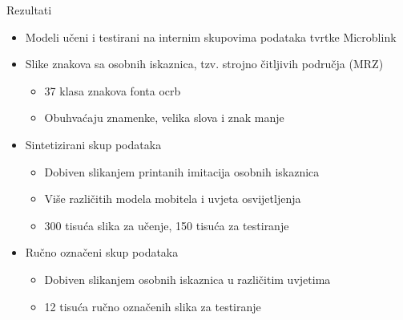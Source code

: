 \documentclass[pdf]{beamer}
\begin{document}
\begin{frame}{Rezultati}

\begin{itemize}
\setlength\itemsep{0.5em}

 \item Modeli učeni i testirani na internim skupovima podataka tvrtke Microblink
 
 \item Slike znakova sa osobnih iskaznica, tzv. strojno čitljivih područja (MRZ)
 \begin{itemize}
 	\item  37 klasa znakova fonta ocrb
 	\item Obuhvaćaju znamenke, velika slova i znak manje
 \end{itemize}
 
 \item Sintetizirani skup podataka
 \begin{itemize}
 	\item  Dobiven slikanjem printanih imitacija osobnih iskaznica
 	\item  Više različitih modela mobitela i uvjeta osvijetljenja
 	\item 300 tisuća slika za učenje, 150 tisuća za testiranje
 \end{itemize}
 
 \item Ručno označeni skup podataka
 \begin{itemize}
 	\item  Dobiven slikanjem osobnih iskaznica u različitim uvjetima
 	\item  12 tisuća ručno označenih slika za testiranje
 \end{itemize}
 
\end{itemize}

\end{frame}
\end{document}
